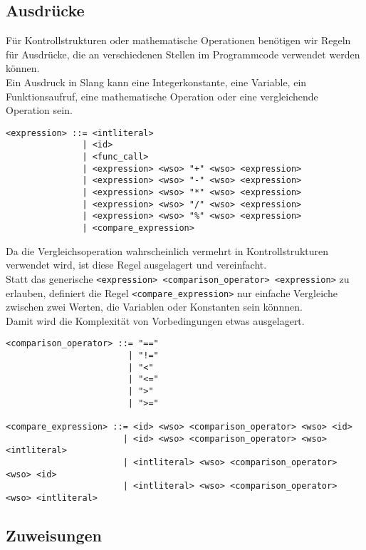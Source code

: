 \subsection{Ausdrücke}

Für Kontrollstrukturen oder mathematische Operationen benötigen wir Regeln für Ausdrücke, die an verschiedenen Stellen im Programmcode verwendet werden können.\\
Ein Ausdruck in Slang kann eine Integerkonstante, eine Variable, ein Funktionsaufruf, eine mathematische Operation oder eine vergleichende Operation sein.

\begin{lstlisting}[caption={Grammatikdefinition Ausdrücke}]
<expression> ::= <intliteral>
               | <id>
               | <func_call>
               | <expression> <wso> "+" <wso> <expression>
               | <expression> <wso> "-" <wso> <expression>
               | <expression> <wso> "*" <wso> <expression>
               | <expression> <wso> "/" <wso> <expression>
               | <expression> <wso> "%" <wso> <expression>
               | <compare_expression>
\end{lstlisting}

Da die Vergleichsoperation wahrscheinlich vermehrt in Kontrollstrukturen verwendet wird, ist diese Regel ausgelagert und vereinfacht.\\
Statt das generische \texttt{<expression> <comparison\_operator> <expression>} zu erlauben, definiert die Regel \texttt{<compare\_expression>} nur einfache Vergleiche zwischen zwei Werten, die Variablen  oder Konstanten sein könnnen.\\
Damit wird die Komplexität von Vorbedingungen etwas ausgelagert.

\begin{lstlisting}[caption={Grammatikdefinition Vergleichsausdrücke}]
<comparison_operator> ::= "=="
                        | "!="
                        | "<"
                        | "<="
                        | ">"
                        | ">="

<compare_expression> ::= <id> <wso> <comparison_operator> <wso> <id>
                       | <id> <wso> <comparison_operator> <wso> <intliteral>
                       | <intliteral> <wso> <comparison_operator> <wso> <id>
                       | <intliteral> <wso> <comparison_operator> <wso> <intliteral>
\end{lstlisting}

\pagebreak

\subsection{Zuweisungen}

